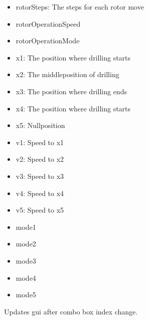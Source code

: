 \documentclass[letterpaper,10pt,english]{sphinxmanual}
\begin{document}
\begin{fulllineitems}
\begin{fulllineitems}
\begin{description}
\begin{itemize}
\item {} 
rotorSteps: The steps for each rotor move

\item {} 
rotorOperationSpeed

\item {} 
rotorOperationMode

\item {} 
x1: The position where drilling starts

\item {} 
x2: The middleposition of drilling

\item {} 
x3: The position where drilling ends

\item {} 
x4: The position where drilling starts

\item {} 
x5: Nullposition

\item {} 
v1: Speed to x1

\item {} 
v2: Speed to x2

\item {} 
v3: Speed to x3

\item {} 
v4: Speed to x4

\item {} 
v5: Speed to x5

\item {} 
mode1

\item {} 
mode2

\item {} 
mode3

\item {} 
mode4

\item {} 
mode5

\end{itemize}

\end{description}

\end{fulllineitems}


\begin{fulllineitems}
\label{gui:gui.Gui.onComboBoxChanged}
Updates gui after combo box index change.


\end{fulllineitems}
\end{fulllineitems}
\end{document}
